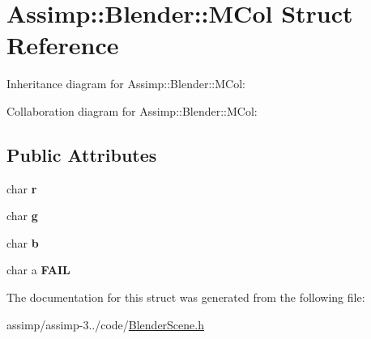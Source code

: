 \hypertarget{struct_assimp_1_1_blender_1_1_m_col}{\section{Assimp\+:\+:Blender\+:\+:M\+Col Struct Reference}
\label{struct_assimp_1_1_blender_1_1_m_col}
}


Inheritance diagram for Assimp\+:\+:Blender\+:\+:M\+Col\+:


Collaboration diagram for Assimp\+:\+:Blender\+:\+:M\+Col\+:
\subsection*{Public Attributes}
\begin{DoxyCompactItemize}
\item 
\hypertarget{struct_assimp_1_1_blender_1_1_m_col_a61fa12df4d6b7f273f3414d7cdc14d44}{char {\bfseries r}}\label{struct_assimp_1_1_blender_1_1_m_col_a61fa12df4d6b7f273f3414d7cdc14d44}

\item 
\hypertarget{struct_assimp_1_1_blender_1_1_m_col_af3a4557348d96cd3389ec8c2adb3c011}{char {\bfseries g}}\label{struct_assimp_1_1_blender_1_1_m_col_af3a4557348d96cd3389ec8c2adb3c011}

\item 
\hypertarget{struct_assimp_1_1_blender_1_1_m_col_a5b8aa5401c30ca322dc6db3e959de691}{char {\bfseries b}}\label{struct_assimp_1_1_blender_1_1_m_col_a5b8aa5401c30ca322dc6db3e959de691}

\item 
\hypertarget{struct_assimp_1_1_blender_1_1_m_col_a79537c65c9221402b2687ea3d8bba591}{char a {\bfseries F\+A\+I\+L}}\label{struct_assimp_1_1_blender_1_1_m_col_a79537c65c9221402b2687ea3d8bba591}

\end{DoxyCompactItemize}


The documentation for this struct was generated from the following file\+:\begin{DoxyCompactItemize}
\item 
assimp/assimp-\/3../code/\hyperlink{_blender_scene_8h}{Blender\+Scene.\+h}\end{DoxyCompactItemize}
